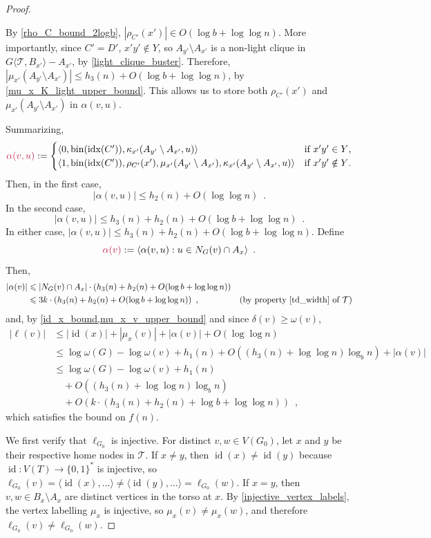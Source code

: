 \documentclass{patmorin}
\makeatletter
\renewcommand{\ge}{\geqslant}
\renewcommand{\le}{\leqslant}
\DeclareMathOperator{\id}{id}
\def\mathcolor#1#{\@mathcolor{#1}}
\def\@mathcolor#1#2#3{%
  \protect\leavevmode
  \begingroup
    \color#1{#2}#3%
  \endgroup
}
\newcommand{\mathdefin}[1]{\mathcolor{brightmaroon}{#1}}
\newcommand{\torso}[2]{{#1}\langle{#2}\rangle}
\DeclareMathOperator{\bin}{bin}
\DeclareMathOperator{\idx}{idx}
\newcommand{\Oh}{O}
\newcommand{\calT}{\mathcal{T}}
\makeatother
\begin{document}
\begin{proof}
\begin{itemize}
    By \cref{rho_C_bound_2logb}, $|\rho_{C'}(x')|\in \Oh(\log b + \log\log n)$.  More importantly, since $C'=D'$, $x'y'\not\in Y$, so $A_{y'}\setminus A_{x'}$ is a non-light clique in $\torso{G}{\calT,B_{x'}}-A_{x'}$, by \ref{light_clique_buster}. Therefore, $|\mu_{x'}(A_{y'}\setminus A_{x'})|\le h_3(n)+ \Oh(\log b +\log\log n)$, by \cref{mu_x_K_light_upper_bound}.  This allows us to store both $\rho_{C'}(x')$ and $\mu_{x'}(A_{y'}\setminus A_{x'})$ in $\alpha(v,u)$.  
  \end{itemize} 
  Summarizing,
  \[
    \mathdefin{\alpha(v,u)} :=
    \begin{cases}
      \langle 0, \bin(\idx(C')), \kappa_{x'}(A_{y'}\setminus A_{x'}, u)\rangle&\text{if $x'y'\in Y$,} \\
      \langle 1, \bin(\idx(C')), \rho_{C'}(x'), \mu_{x'}(A_{y'}\setminus A_{x'}), \kappa_{x'}(A_{y'}\setminus A_{x'}, u)\rangle&\text{if  $x'y'\notin Y$.} 
    \end{cases}
  \]
  Then, in the first case,
  \[
    |\alpha(v,u)| \le h_2(n) + \Oh(\log\log n) \enspace .
  \] 
  In the second case,
  \[
    |\alpha(v,u)| \le h_3(n) + h_2(n)+ \Oh(\log b+\log\log n) \enspace .
  \]
  In either case, $|\alpha(v,u)|\le h_3(n)+h_2(n)+ \Oh(\log b+\log\log n)$.  
  Define
  \[
    \mathdefin{\alpha(v)} := \langle \alpha(v,u):u\in N_G(v)\cap A_x \rangle \enspace .
  \] 
  Then,
  \begin{align*}
    |\alpha(v)| & \le |N_G(v)\cap A_x|\cdot (h_3(n)+h_2(n)+\Oh(\log b+\log\log n)) \\
    & \le 3k\cdot(h_3(n) + h_2(n) + \Oh(\log b+\log\log n) ) \enspace ,
    & \text{(by property~\ref{td_width} of $\calT$)}
  \end{align*}
  and, by \cref{id_x_bound,mu_x_v_upper_bound} and since $\delta(v)\ge\omega(v)$,
  \begin{align*}
    |\ell(v)| & \le |\id(x)| + |\mu_x(v)| + |\alpha(v)| + \Oh(\log\log n) \\
     & \le \log \omega(G) - \log \omega(v) + h_1(n) + \Oh((h_3(n)+\log\log n)\log_b n) + |\alpha(v)| \\
     & \le \log \omega(G) - \log \omega(v) + h_1(n) \\
     & \quad + \Oh((h_3(n)+\log\log n)\log_b n) \\
     & \quad + \Oh(k\cdot(h_3(n) + h_2(n) + \log b + \log\log n) ) \enspace ,
  \end{align*}
  which satisfies the bound on $f(n)$.

  We first verify that $\ell_{G_0}$ is injective. For distinct $v,w\in V(G_0)$, let $x$ and $y$ be their respective home nodes in $\calT$. If $x\neq y$, then $\id(x)\neq\id(y)$ because $\id:V(T)\to\{0,1\}^*$ is injective, so $\ell_{G_0}(v)=\langle\id(x),\dots\rangle \neq \langle\id(y),\dots\rangle = \ell_{G_0}(w)$. If $x=y$, then $v,w\in B_x\setminus A_x$ are distinct vertices in the torso at $x$. By \cref{injective_vertex_labels}, the vertex labelling $\mu_x$ is injective, so $\mu_x(v)\neq\mu_x(w)$, and therefore $\ell_{G_0}(v)\neq\ell_{G_0}(w)$.


\end{proof}
\end{document}

